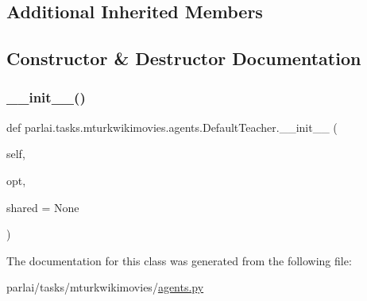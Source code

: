 \subsection*{Additional Inherited Members}


\subsection{Constructor \& Destructor Documentation}
\mbox{\label{classparlai_1_1tasks_1_1mturkwikimovies_1_1agents_1_1DefaultTeacher_ae77ddc3240f18cf49cc2c2a5c4dcfb49}} 
\subsubsection{\texorpdfstring{\+\_\+\+\_\+init\+\_\+\+\_\+()}{\_\_init\_\_()}}
{\footnotesize\ttfamily def parlai.\+tasks.\+mturkwikimovies.\+agents.\+Default\+Teacher.\+\_\+\+\_\+init\+\_\+\+\_\+ (\begin{DoxyParamCaption}\item[{}]{self,  }\item[{}]{opt,  }\item[{}]{shared = {\ttfamily None} }\end{DoxyParamCaption})}



The documentation for this class was generated from the following file\+:\begin{DoxyCompactItemize}
\item 
parlai/tasks/mturkwikimovies/\hyperlink{parlai_2tasks_2mturkwikimovies_2agents_8py}{agents.\+py}\end{DoxyCompactItemize}
